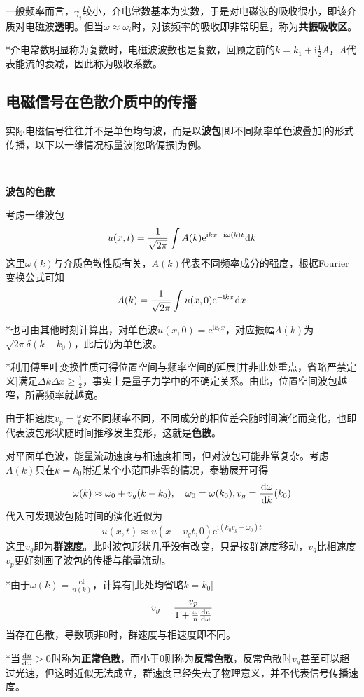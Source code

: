 \documentclass[a4paper,UTF8,fontset=windows]{ctexart}
\newcommand*{\dr}{\hspace{0.07em}\mathrm{d}}
\newcommand*{\er}{\mathrm{e}}
\newcommand*{\ir}{\mathrm{i}}
\newcommand*{\dt}[2][t]{\frac{\dr #2}{\dr #1}}
\begin{document}
一般频率而言，$\gamma_i$较小，介电常数基本为实数，于是对电磁波的吸收很小，即该介质对电磁波\textbf{透明}。但当$\omega\approx\omega_i$时，对该频率的吸收即非常明显，称为\textbf{共振吸收区}。

*介电常数明显称为复数时，电磁波波数也是复数，回顾之前的$k=k_1+\ir\frac{1}{2}A$，$A$代表能流的衰减，因此称为吸收系数。

\subsection{电磁信号在色散介质中的传播}
实际电磁信号往往并不是单色均匀波，而是以\textbf{波包}[即不同频率单色波叠加]的形式传播，以下以一维情况标量波[忽略偏振]为例。

\

\textbf{波包的色散}

考虑一维波包
$$u(x,t)=\frac{1}{\sqrt{2\pi}}\int A(k)\er^{\ir kx-\ir\omega(k)t}\dr k$$
这里$\omega(k)$与介质色散性质有关，$A(k)$代表不同频率成分的强度，根据Fourier变换公式可知
$$A(k)=\frac{1}{\sqrt{2\pi}}\int u(x,0)\er^{-\ir kx}\dr x$$

*也可由其他时刻计算出，对单色波$u(x,0)=\er^{\ir k_0x}$，对应振幅$A(k)$为$\sqrt{2\pi}\delta(k-k_0)$，此后仍为单色波。

*利用傅里叶变换性质可得位置空间与频率空间的延展[并非此处重点，省略严禁定义]满足$\Delta k\Delta x\ge\frac{1}{2}$，事实上是量子力学中的不确定关系。由此，位置空间波包越窄，所需频率就越宽。

由于相速度$v_p=\frac{\omega}{k}$对不同频率不同，不同成分的相位差会随时间演化而变化，也即代表波包形状随时间推移发生变形，这就是\textbf{色散}。

对平面单色波，能量流动速度与相速度相同，但对波包可能非常复杂。考虑$A(k)$只在$k=k_0$附近某个小范围非零的情况，泰勒展开可得
$$\omega(k)\approx\omega_0+v_g(k-k_0),\quad\omega_0=\omega(k_0),v_g=\dt[k]{\omega}(k_0)$$
代入可发现波包随时间的演化近似为
$$u(x,t)\approx u(x-v_gt,0)\er^{\ir(k_0v_g-\omega_0)t}$$
这里$v_g$即为\textbf{群速度}。此时波包形状几乎没有改变，只是按群速度移动，$v_g$比相速度$v_p$更好刻画了波包的传播与能量流动。

*由于$\omega(k)=\frac{ck}{n(k)}$，计算有[此处均省略$k=k_0$]
$$v_g=\frac{v_p}{1+\frac{\omega}{n}\dt[\omega]{n}}$$
当存在色散，导数项非0时，群速度与相速度即不同。

*当$\dt[\omega]{n}>0$时称为\textbf{正常色散}，而小于0则称为\textbf{反常色散}，反常色散时$v_g$甚至可以超过光速，但这时近似无法成立，群速度已经失去了物理意义，并不代表信号传播速度。

\
\end{document}
